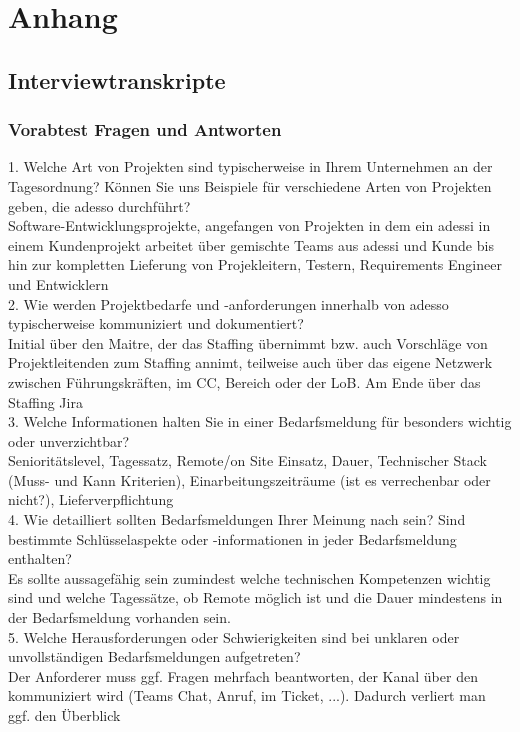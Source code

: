 \chapter{Anhang}
\label{chap:ergebnisse}
\section{Interviewtranskripte}
\subsection{Vorabtest Fragen und Antworten}
1. Welche Art von Projekten sind typischerweise in Ihrem Unternehmen an der Tagesordnung? Können Sie uns Beispiele für verschiedene Arten von Projekten geben, die adesso
durchführt?\\
Software-Entwicklungsprojekte, angefangen von Projekten in dem ein adessi in einem Kundenprojekt arbeitet über gemischte Teams aus adessi und Kunde bis hin zur kompletten Lieferung von Projekleitern, Testern, Requirements Engineer  und Entwicklern\\

2. Wie werden Projektbedarfe und -anforderungen innerhalb von adesso typischerweise kommuniziert und dokumentiert?\\
Initial über den Maitre, der das Staffing übernimmt bzw. auch Vorschläge von Projektleitenden zum Staffing annimt, teilweise auch über das eigene Netzwerk zwischen Führungskräften, im CC, Bereich oder der LoB. Am Ende über das Staffing Jira\\

3. Welche Informationen halten Sie in einer Bedarfsmeldung für besonders wichtig oder unverzichtbar?\\
Senioritätslevel, Tagessatz, Remote/on Site Einsatz, Dauer, Technischer Stack (Muss- und Kann Kriterien), Einarbeitungszeiträume (ist es verrechenbar oder nicht?), Lieferverpflichtung\\


4. Wie detailliert sollten Bedarfsmeldungen Ihrer Meinung nach sein? Sind bestimmte Schlüsselaspekte oder -informationen in jeder Bedarfsmeldung enthalten?\\
Es sollte aussagefähig sein zumindest welche technischen Kompetenzen wichtig sind und welche Tagessätze, ob Remote möglich ist und die Dauer mindestens in der Bedarfsmeldung vorhanden sein.\\ 


5. Welche Herausforderungen oder Schwierigkeiten sind bei unklaren oder unvollständigen Bedarfsmeldungen aufgetreten?\\
Der Anforderer muss ggf. Fragen mehrfach beantworten, der Kanal über den kommuniziert wird (Teams Chat, Anruf, im Ticket, ...). Dadurch verliert man ggf. den Überblick\\

